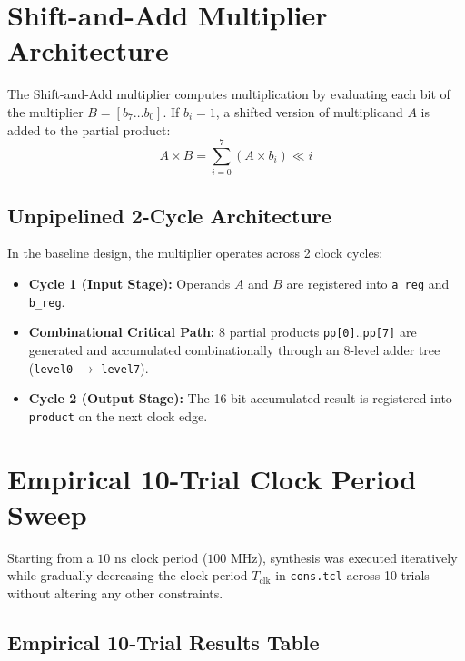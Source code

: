 \documentclass[12pt,a4paper]{article}
\begin{document}
\section{Shift-and-Add Multiplier Architecture}

The Shift-and-Add multiplier computes multiplication by evaluating each bit of the multiplier $B = [b_7 \dots b_0]$. If $b_i = 1$, a shifted version of multiplicand $A$ is added to the partial product:
\begin{equation}
A \times B = \sum_{i=0}^{7} (A \times b_i) \ll i
\end{equation}

\subsection{Unpipelined 2-Cycle Architecture}
In the baseline design, the multiplier operates across 2 clock cycles:
\begin{itemize}
  \item \textbf{Cycle 1 (Input Stage):} Operands $A$ and $B$ are registered into \texttt{a\_reg} and \texttt{b\_reg}.
  \item \textbf{Combinational Critical Path:} 8 partial products \texttt{pp[0]}..\texttt{pp[7]} are generated and accumulated combinationally through an 8-level adder tree (\texttt{level0} $\to$ \texttt{level7}).
  \item \textbf{Cycle 2 (Output Stage):} The 16-bit accumulated result is registered into \texttt{product} on the next clock edge.
\end{itemize}

\section{Empirical 10-Trial Clock Period Sweep}

Starting from a $10\text{ ns}$ clock period ($100\text{ MHz}$), synthesis was executed iteratively while gradually decreasing the clock period $T_{\text{clk}}$ in \texttt{cons.tcl} across 10 trials without altering any other constraints.

\subsection{Empirical 10-Trial Results Table}
\end{document}

